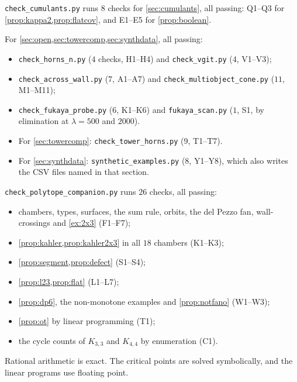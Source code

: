 \documentclass[11pt]{article}
\theoremstyle{definition}
\theoremstyle{remark}
\begin{document}
\texttt{check\_cumulants.py} runs $8$ checks for \cref{sec:cumulants}, all passing: Q1--Q3 for
\cref{prop:kappa2,prop:flatcov}, and E1--E5 for \cref{prop:boolean}.

For \cref{sec:open,sec:towercomp,sec:synthdata}, all passing:
\begin{itemize}[leftmargin=*]
\item \texttt{check\_horns\_n.py} ($4$ checks, H1--H4) and \texttt{check\_vgit.py} ($4$, V1--V3);
\item \texttt{check\_across\_wall.py} ($7$, A1--A7) and \texttt{check\_multiobject\_cone.py} ($11$, M1--M11);
\item \texttt{check\_fukaya\_probe.py} ($6$, K1--K6) and \texttt{fukaya\_scan.py} ($1$, S1, by elimination at $\lambda=500$
  and $2000$).
\item For \cref{sec:towercomp}: \texttt{check\_tower\_horns.py} ($9$, T1--T7).
\item For \cref{sec:synthdata}: \texttt{synthetic\_examples.py} ($8$, Y1--Y8), which also writes the CSV files named in
  that section.
\end{itemize}

\texttt{check\_polytope\_companion.py} runs $26$ checks, all passing:
\begin{itemize}[leftmargin=*]
\item chambers, types, surfaces, the sum rule, orbits, the del Pezzo fan, wall-crossings and
  \cref{ex:2x3} (F1--F7);
\item \cref{prop:kahler,prop:kahler2x3} in all $18$ chambers (K1--K3);
\item \cref{prop:segment,prop:defect} (S1--S4);
\item \cref{prop:l23,prop:flat} (L1--L7);
\item \cref{prop:dp6}, the non-monotone examples and \cref{prop:notfano} (W1--W3);
\item \cref{prop:ot} by linear programming (T1);
\item the cycle counts of $K_{3,3}$ and $K_{4,4}$ by enumeration (C1).
\end{itemize}
Rational arithmetic is exact. The critical points are solved symbolically, and the linear programs use
floating point.
\end{document}
